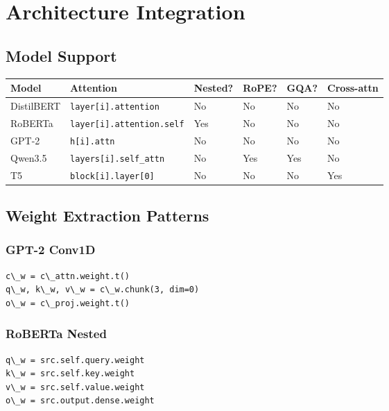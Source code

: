\section{Architecture Integration}

\subsection{Model Support}

\begin{table}[H]
\centering
\small
\begin{tabular}{llllll}
\toprule
\textbf{Model} & \textbf{Attention} & \textbf{Nested?} & \textbf{RoPE?} & \textbf{GQA?} & \textbf{Cross-attn} \\
\midrule
DistilBERT & \texttt{layer[i].attention} & No & No & No & No \\
RoBERTa & \texttt{layer[i].attention.self} & Yes & No & No & No \\
GPT-2 & \texttt{h[i].attn} & No & No & No & No \\
Qwen3.5 & \texttt{layers[i].self\_attn} & No & Yes & Yes & No \\
T5 & \texttt{block[i].layer[0]} & No & No & No & Yes \\
\bottomrule
\end{tabular}
\end{table}

\subsection{Weight Extraction Patterns}

\subsubsection{GPT-2 Conv1D}

\begin{lstlisting}
c\_w = c\_attn.weight.t()
q\_w, k\_w, v\_w = c\_w.chunk(3, dim=0)
o\_w = c\_proj.weight.t()
\end{lstlisting}

\subsubsection{RoBERTa Nested}

\begin{lstlisting}
q\_w = src.self.query.weight
k\_w = src.self.key.weight
v\_w = src.self.value.weight
o\_w = src.output.dense.weight
\end{lstlisting}


